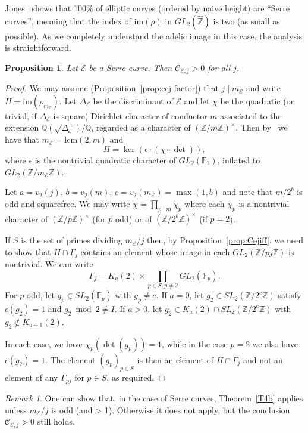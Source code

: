 \documentclass{amsart}
\theoremstyle{plain}
\newtheorem{prop}[theorem]{Proposition}
\theoremstyle{remark}
\newtheorem{remark}[theorem]{Remark}
\newcommand{\F}{\mathbb{F}}
\newcommand{\Q}{\mathbb{Q}}
\newcommand{\Z}{\mathbb{Z}}
\newcommand{\E}{\mathcal{E}}
\newcommand{\Cc}{\mathcal{C}}
\newcommand{\im}{\mathrm{im}}
\newcommand{\lcm}{\mathrm{lcm}}
\begin{document}
Jones~\cite{jones_almost_2010} shows that 100\% of elliptic curves (ordered by naive height) are ``Serre curves'', meaning that the index of $\im(\rho)$ in $GL_2(\hat{\Z})$ is two (as small as possible). As we completely understand the adelic image in this case, the analysis is straightforward.
\begin{prop}\label{prop:serre} Let $\E$ be a Serre curve. Then $\Cc_{\E,j} > 0$ for all $j$.
\end{prop}
\begin{proof}
    We may assume (Proposition~\ref{prop:cej-factor}) that $j \mid m_\E$ and write $H = \im(\rho_{m_\E})$.
    Let $\Delta_\E$ be the discriminant of $\E$ and let $\chi$ be the quadratic (or trivial, if $\Delta_\E$ is square) Dirichlet character of conductor $m$ associated to the extension $\Q(\sqrt{\Delta_\E})/\Q$, regarded as a character of $(\Z/m\Z)^\times$.  Then by~\cite[section 3]{jones_averages_2009} we have that $m_\E = \lcm(2,m)$ and
    \[H = \ker(\epsilon\cdot(\chi\circ \det)),\]
    where $\epsilon$ is the nontrivial quadratic character of $GL_2(\F_2)$, inflated to $GL_2(\Z/m_\E\Z)$.

	    Let $a = v_2(j)$, $b = v_2(m)$, $c = v_2(m_\E) = \max(1,b)$ and note that $m/2^b$ is odd and squarefree. We may write $\chi = \prod_{p \mid m} \chi_p$ where each $\chi_p$ is a nontrivial character of $(\Z/p\Z)^\times$ (for $p$ odd) or of $(\Z/2^{b}\Z)^\times$ (if $p = 2$). 

    If $S$ is the set of primes dividing $m_\E/j$ then, by Proposition~\ref{prop:Cejiff}, we need to show that $H \cap \Gamma_j$ contains an element whose image in each $GL_2(\Z/pj\Z)$ is nontrivial. We can write 
    \[\Gamma_j = K_{a}(2) \times \prod_{p \in S, p\ne 2} GL_2(\F_p).\]
     For $p$ odd, let $g_p \in SL_2(\F_p)$ with $g_p \ne e$. If $a = 0$, let $g_2 \in SL_2(\Z/2^{c}\Z)$ satisfy $\epsilon(g_2) = 1$ and $g_2 \bmod 2 \ne I$. If $a > 0$, let $g_2 \in K_a(2) \cap SL_2(\Z/2^c\Z)$ with $g_2 \not \in K_{a+1}(2)$. 
     
     In each case, we have $\chi_p(\det(g_p)) = 1$, while in the case $p = 2$ we also have $\epsilon(g_2) = 1$. The element $(g_{p})_{p \in S}$ is then an element of $H \cap \Gamma_j$ and not an element of any $\Gamma_{pj}$ for $p \in S$, as required.
\end{proof}

\begin{remark}
    One can show that, in the case of Serre curves, Theorem~\ref{T4b} applies unless $m_\E/j$ is odd (and > 1). Otherwise it does not apply, but the conclusion $\Cc_{\E,j} > 0$ still holds.
\end{remark}
\end{document}
